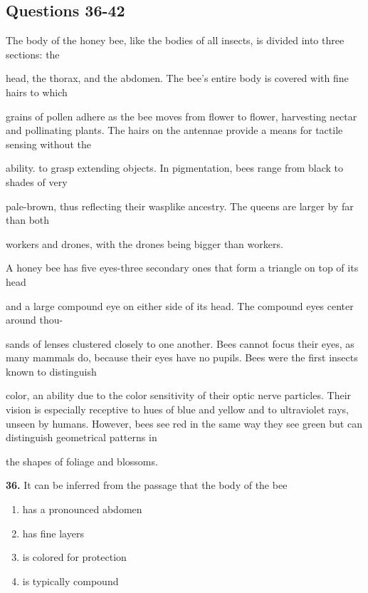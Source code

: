 \documentclass[12pt]{article}
\begin{document}
\subsection*{Questions 36-42}
\begingroup
\small
\sloppy
\setlength{\parskip}{0pt}
\setlength{\parindent}{0pt}
The body of the honey bee, like the bodies of all insects, is divided into three sections: the\par
head, the thorax, and the abdomen. The bee's entire body is covered with fine hairs to which\par
grains of pollen adhere as the bee moves from flower to flower, harvesting nectar and pollinating plants. The hairs on the antennae provide a means for tactile sensing without the\par
ability. to grasp extending objects. In pigmentation, bees range from black to shades of very\par
pale-brown, thus reflecting their wasplike ancestry. The queens are larger by far than both\par
workers and drones, with the drones being bigger than workers.\par
A honey bee has five eyes-three secondary ones that form a triangle on top of its head\par
and a large compound eye on either side of its head. The compound eyes center around thou-\par
sands of lenses clustered closely to one another. Bees cannot focus their eyes, as many mammals do, because their eyes have no pupils. Bees were the first insects known to distinguish\par
color, an ability due to the color sensitivity of their optic nerve particles. Their vision is especially receptive to hues of blue and yellow and to ultraviolet rays, unseen by humans. However, bees see red in the same way they see green but can distinguish geometrical patterns in\par
the shapes of foliage and blossoms.\par
\endgroup
\medskip
\noindent\textbf{36.} It can be inferred from the passage that the body of the bee
\begin{enumerate}[label=(\Alph*),leftmargin=*,itemsep=0.2em]
\item has a pronounced abdomen
\item has fine layers
\item is colored for protection
\item is typically compound
\end{enumerate}
\par
\end{document}

